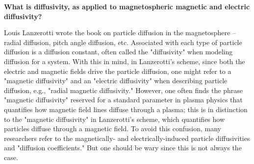 \textbf{What is diffusivity, as applied to magnetospheric magnetic and
electric diffusivity?}

Louis Lanzerotti wrote the book on particle diffusion in the
magnetosphere -- radial diffusion,
pitch angle diffusion, etc. Associated with each type of particle
diffusion is a diffusion constant, often called the "diffusivity" when
modeling diffusion for a system. With this in mind, in Lanzerotti's
scheme, since both the electric and magnetic fields drive the particle
diffusion, one might refer to a "magnetic diffusivity" and an "electric
diffusivity" when describing particle diffusion, e.g., "radial magnetic
diffusivity." However, one often finds the phrase
"magnetic diffusivity" reserved for a standard parameter in plasma physics 
that quantifies how magnetic field lines diffuse through a plasma; this
is in distinction to the "magnetic diffusivity" in Lanzerotti's scheme, which 
quantifies how particles diffuse through a magnetic field. To avoid this
confusion, many researchers refer to the magnetically- and
electrically-induced particle diffusivities and "diffusion
coefficients." But one should be wary since this is not always the case.
